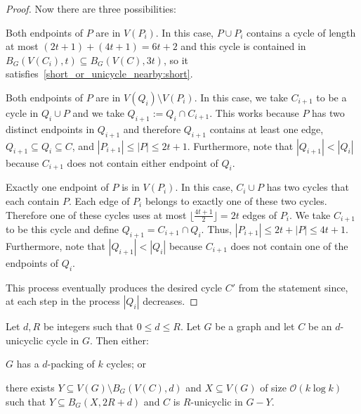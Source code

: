 \documentclass{patmorin}
\newcommand{\piotr}[1]{\textcolor{red}{Piotr: #1}}
\newcommand{\Oh}{\mathcal{O}}
\begin{document}
\begin{proof}
  Now there are three possibilities:
  \begin{compactenum}
    \item Both endpoints of $P$ are in $V(P_{i})$.
    In this case, $P\cup P_{i}$ contains a cycle of length at most
    $(2t+1)+(4t+1)=6t+2$ and this cycle is contained in $B_G(V(C_i),t)\subseteq B_G(V(C),3t)$, so it satisfies~\eqref{short_or_unicycle_nearby:short}.
    \item Both endpoints of $P$ are in $V(Q_{i})\setminus V(P_{i})$.
    In this case, we take $C_{i+1}$ to be a cycle in $Q_{i}\cup P$ and
    we take $Q_{i+1}:= Q_i\cap C_{i+1}$. %
    This works because $P$ has two distinct endpoints in $Q_{i+1}$
    and therefore $Q_{i+1}$ contains at least one edge,
    $Q_{i+1}\subseteq Q_i\subseteq C$, and
    $|P_{i+1}|\leq|P|\leq 2t+1$.
    Furthermore, note that $|Q_{i+1}| < |Q_{i}|$ because $C_{i+1}$ does not contain either endpoint of $Q_{i}$.
    \item Exactly one endpoint of $P$ is in $V(P_{i})$.
    In this case, $C_{i}\cup P$ has two cycles that each contain $P$.
    Each edge of $P_{i}$ belongs to exactly one of these two cycles.
    Therefore one of these cycles uses at most $\lfloor\frac{4t+1}{2}\rfloor=2t$ edges of $P_{i}$.
    We take $C_{i+1}$ to be this cycle and define
    $Q_{i+1}=C_{i+1}\cap Q_i$. %
    Thus, $|P_{i+1}| \leq 2t+|P|\leq 4t+1$.
    Furthermore, note that $|Q_{i+1}| < |Q_{i}|$ because $C_{i+1}$ does not contain one of the endpoints of $Q_{i}$.
  \end{compactenum}
  This process eventually produces the desired cycle $C'$ from the statement since, at each step in the process $|Q_i|$ decreases.
\end{proof}

\begin{lem}\label{grow_unicycle}
  Let $d,R$ be integers such that $0\leq d \leq R$.
  Let $G$ be a graph and let $C$ be an $d$-unicyclic cycle in $G$.
  Then either:
  \begin{compactenum}[(a)]
    \item $G$ has a $d$-packing of $k$ cycles; or
    \label{grow_unicycle:item:packing}
    \item %
    there exists $Y\subseteq V(G)\setminus B_G(V(C),d)$ and $X\subseteq V(G)$ of size $\Oh(k\log k)$ such that $Y\subseteq B_G(X,2R+d)$ and
    $C$ is $R$-unicyclic in $G-Y$.
  \end{compactenum}
\end{lem}
\end{document}
